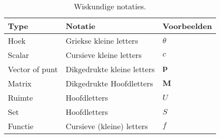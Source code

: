 \begin{table}
  \centering
  \begin{tabular}{@{}lll@{}}\toprule
    Type           & Notatie                    & Voorbeelden  \\ \midrule
    Hoek           & Griekse kleine letters     & $\theta$     \\
    Scalar         & Cursieve kleine letters    & $\mathit{c}$ \\
    Vector of punt & Dikgedrukte kleine letters & $\mathbf{p}$ \\
    Matrix         & Dikgedrukte Hoofdletters   & $\mathbf{M}$ \\
    Ruimte         & Hoofdletters               & $U$          \\
    Set            & Hoofdletters               & $S$          \\
    Functie        & Cursieve (kleine) letters  & $\mathit{f}$ \\ \bottomrule
  \end{tabular}
  \caption{Wiskundige notaties.}
  \label{tbl:math-notaties}
\end{table}

